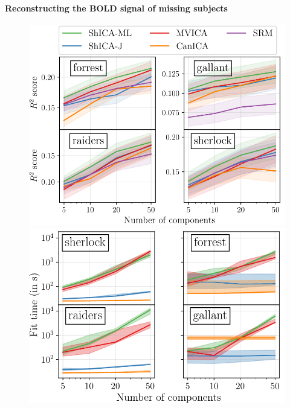 \documentclass{report}
\begin{document}
{\paragraph{Reconstructing the BOLD signal of missing subjects}
\begin{figure}
\vspace{-0.5em}
  \centering
  \includegraphics[width=0.99\linewidth]{./figures/amvica/reconstruction.pdf}
  \includegraphics[width=0.99\linewidth]{./figures/amvica/reconstruction_timings.pdf}
  

\end{figure}}
\end{document}
